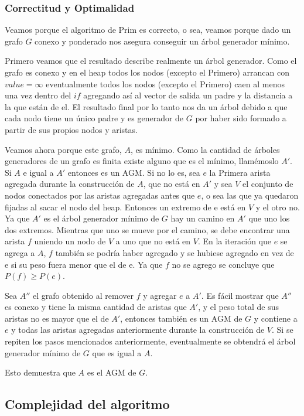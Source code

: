 \subsubsection{Correctitud y Optimalidad}

Veamos porque el algoritmo de Prim es correcto, o sea, veamos porque dado un grafo $G$ conexo y ponderado nos asegura conseguir un árbol generador mínimo.

Primero veamos que el resultado describe realmente un árbol generador. Como el grafo es conexo y en el heap todos los nodos (excepto el Primero) arrancan con $value = \infty$  eventualmente todos los nodos (excepto el Primero) caen al menos una vez dentro del $if$ agregando así al vector de salida un padre y la distancia a la que están de el. El resultado final por lo tanto nos da un árbol debido a que cada nodo tiene un único padre y es generador de $G$ por haber sido formado a partir de sus propios nodos y aristas.

Veamos ahora porque este grafo, $A$, es mínimo.
Como la cantidad de árboles generadores de un grafo es finita existe alguno que es el mínimo, llam\'emoslo $A'$.
Si $A$ e igual a $A'$ entonces es un AGM.
Si no lo es, sea $e$ la Primera arista agregada durante la construcción de $A$, que no está en $A'$ y sea $V$ el conjunto de nodos conectados por las aristas agregadas antes que $e$, o sea las que ya quedaron fijadas al sacar el nodo del heap.
Entonces un extremo de e está en $V$ y el otro no. Ya que $A'$ es el árbol generador mínimo de $G$ hay un camino en $A'$ que uno los dos extremos. Mientras que uno se mueve por el camino, se debe encontrar una arista $f$ uniendo un nodo de $V$ a uno que no está en $V$. En la iteración que $e$ se agrega a $A$, $f$ también se podría haber agregado y se hubiese agregado en vez de e si su peso fuera menor que el de e. Ya que $f$ no se agrego se concluye que $P(f) \geq P(e)$.

Sea $A''$ el grafo obtenido al remover $f$ y agregar $e$ a $A'$. Es fácil mostrar que $A''$ es conexo y tiene la misma cantidad de aristas que $A'$, y el peso total de sus aristas no es mayor que el de $A'$, entonces también es un AGM de $G$ y contiene a $e$ y todas las aristas agregadas anteriormente durante la construcción de $V$. Si se repiten los pasos mencionados anteriormente, eventualmente se obtendrá el árbol generador mínimo de $G$ que es igual a $A$.

Esto demuestra que $A$ es el AGM de $G$.

\subsection{Complejidad del algoritmo}

